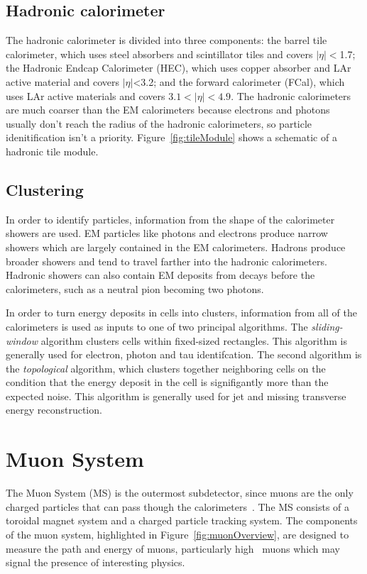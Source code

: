 \subsection{Hadronic calorimeter}
The hadronic calorimeter is divided into three components: the barrel tile calorimeter, which uses steel absorbers and scintillator tiles and covers $|\eta| <$1.7; the Hadronic Endcap Calorimeter (HEC), which uses copper absorber and LAr active material and covers $|\eta|$<3.2; and the forward calorimeter (FCal), which uses LAr active materials and covers $3.1 < |\eta| < 4.9$. The hadronic calorimeters are much coarser than the EM calorimeters because electrons and photons usually don't reach the radius of the hadronic calorimeters, so particle idenitification isn't a priority. Figure~\ref{fig:tileModule} shows a schematic of a hadronic tile module.

\subsection{Clustering}
In order to identify particles, information from the shape of the calorimeter showers are used. EM particles like photons and electrons produce narrow showers which are largely contained in the EM calorimeters. Hadrons produce broader showers and tend to travel farther into the hadronic calorimeters. Hadronic showers can also contain EM deposits from decays before the calorimeters, such as a neutral pion becoming two photons. 

In order to turn energy deposits in cells into clusters, information from all of the calorimeters is used as inputs to one of two principal algorithms\cite{ATL-LARG-PUB-2008-002}. The \emph{sliding-window} algorithm clusters cells within fixed-sized rectangles. This algorithm is generally used for electron, photon and tau identifcation. The second algorithm is the \emph{topological} algorithm, which clusters together neighboring cells on the condition that the energy deposit in the cell is signifigantly more than the expected noise. This algorithm is generally used for jet and missing transverse energy reconstruction.

\section{Muon System}
The Muon System (MS) is the outermost subdetector, since muons are the only charged particles that can pass though the calorimeters~\cite{2010.muonspectrometer}. The MS consists of a toroidal magnet system and a charged particle tracking system. The components of the muon system, highlighted in Figure~\ref{fig:muonOverview}, are designed to measure the path and energy of muons, particularly high \pt\ muons which may signal the presence of interesting physics.

